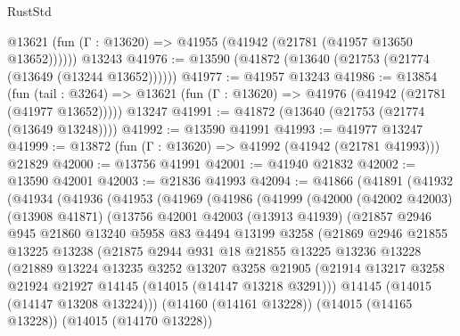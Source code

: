 \begin{lexlean}{RustStd}
\begin{coremodule}
      @13621 (fun (Γ : @13620) => @41955 (@41942 (@21781 (@41957 @13650 @13652))))))
    @13243
@41976 := @13590 (@41872 (@13640 (@21753 (@21774 (@13649 (@13244 @13652))))))
@41977 := @41957 @13243
@41986 := @13854
    (fun (tail : @3264) => @13621 (fun (Γ : @13620) => @41976 (@41942 (@21781 (@41977 @13652)))))
    @13247
@41991 := @41872 (@13640 (@21753 (@21774 (@13649 @13248))))
@41992 := @13590 @41991
@41993 := @41977 @13247
@41999 := @13872 (fun (Γ : @13620) => @41992 (@41942 (@21781 @41993))) @21829
@42000 := @13756 @41991
@42001 := @41940 @21832
@42002 := @13590 @42001
@42003 := @21836 @41993
@42094 := @41866
    (@41891
      (@41932
        (@41934
          (@41936
            (@41953
              (@41969
                (@41986
                  (@41999
                    (@42000
                      (@42002 @42003)
                      (@13908 @41871)
                      (@13756
                        @42001
                        @42003
                        (@13913 @41939)
                        (@21857
                          @2946
                          @945
                          @21860
                          @13240
                          @5958
                          @83
                          @4494
                          @13199
                          @3258
                          (@21869
                            @2946
                            @21855
                            @13225
                            @13238
                            (@21875
                              @2944
                              @931
                              @18
                              @21855
                              @13225
                              @13236
                              @13228
                              (@21889
                                @13224
                                @13235
                                @3252
                                @13207
                                @3258
                                @21905
                                (@21914
                                  @13217
                                  @3258
                                  @21924
                                  @21927
                                  @14145
                                  (@14015 (@14147 @13218 @3291)))
                                @14145
                                (@14015 (@14147 @13208 @13224)))
                              (@14160 (@14161 @13228))
                              (@14015 (@14165 @13228))
                              (@14015 (@14170 @13228))

\end{coremodule}
\end{lexlean}
